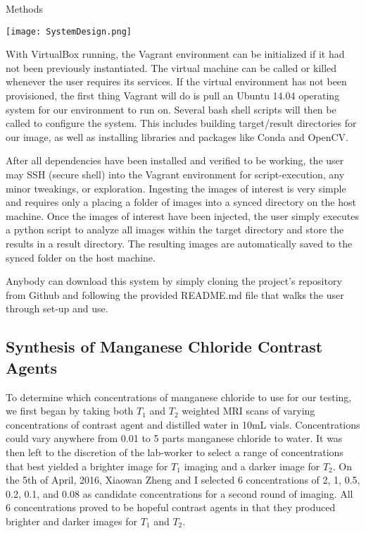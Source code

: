 \documentclass[a4paper,12pt]{article}
\begin{document}
\begin{section}{Methods}
\begin{center}
\texttt{[image: SystemDesign.png]}
\end{center}

With VirtualBox running, the Vagrant environment can be initialized if it had not been previously instantiated. The virtual machine can be called or killed whenever the user requires its services. If the virtual environment has not been provisioned, the first thing Vagrant will do is pull an Ubuntu 14.04 operating system for our environment to run on. Several bash shell scripts will then be called to configure the system. This includes building target/result directories for our image, as well as installing libraries and packages like Conda and OpenCV. 

After all dependencies have been installed and verified to be working, the user may SSH (secure shell) into the Vagrant environment for script-execution, any minor tweakings, or exploration. Ingesting the images of interest is very simple and requires only a placing a folder of images into a synced directory on the host machine. Once the images of interest have been injected, the user simply executes a python script to analyze all images within the target directory and store the results in a result directory. The resulting images are automatically saved to the synced folder on the host machine.

Anybody can download this system by simply cloning the project's repository from Github and following the provided README.md file that walks the user through set-up and use.

\subsection{Synthesis of Manganese Chloride Contrast Agents}

To determine which concentrations of manganese chloride to use for our testing, we first began by taking both $T_1$ and $T_2$ weighted MRI scans of varying concentrations of contrast agent and distilled water in 10mL vials. Concentrations could vary anywhere from 0.01 to 5 parts manganese chloride to water. It was then left to the discretion of the lab-worker to select a range of concentrations that best yielded a brighter image for $T_1$ imaging and a darker image for $T_2$. On the 5th of April, 2016, Xiaowan Zheng and I selected 6 concentrations of 2, 1, 0.5, 0.2, 0.1, and 0.08 as candidate concentrations for a second round of imaging. All 6 concentrations proved to be hopeful contrast agents in that they produced brighter and darker images for $T_1$ and $T_2$.\\


\end{section}
\end{document}
